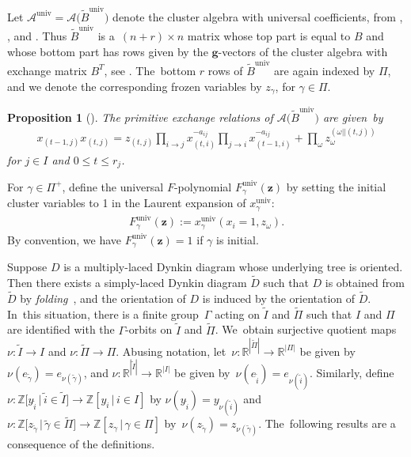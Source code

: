\documentclass[pdftex]{sigma}%
\def\R{{\mathbb R}}
\def\Z{{\mathbb Z}}
\def\A{{\mathcal{A}}}
\def\univ{{\operatorname{univ}}}
\def\tB{{\tilde B}}
\def\tD{{\tilde D}}
\def\tB{{\tilde B}}
\def\tI{{\tilde I}}
\def\z{{\mathbf z}}
\def\g{{\mathbf g}}
\def\tgamma{{\tilde \gamma}}
\def\tPi{{\tilde \Pi}}
\numberwithin{equation}{section}
\newtheorem{Proposition}[Theorem]{Proposition}
\begin{document}
\bigskip{}
Let $\A^{\univ} = \A\big(\tB^\univ\big)$ denote the cluster algebra with universal coefficients, from \cite[Theorem~12.4]{CA4}, \cite[Section~5]{YZ}, and \cite[Theorem~10.12 and Remark 10.13]{Reading}. Thus $\tB^{\univ}$ is a~$(n+r) \times n$ matrix whose top part is equal to $B$ and whose bottom part has rows given by the $\g$-vectors of the cluster algebra with exchange matrix $B^T$, see \cite{Reading}. The~bottom $r$ rows of $\tB^\univ$ are again indexed by $\Pi$, and we denote the corresponding frozen variables by $z_\gamma$, for $\gamma \in \Pi$.

\begin{Proposition}[{\cite[Proposition~5.6]{YZ}}] \label{prop:YZ}
The primitive exchange relations of $\A\big(\tB^\univ\big)$ are given~by
\begin{gather}\label{eq:exchange}
x_{(t-1,j)} x_{(t,j)} = z_{(t,j)} \prod_{i \to j} x_{(t,i)}^{-a_{ij}} \prod_{j \to i} x_{(t-1,i)}^{-a_{ij}} + \prod_\omega z_\omega^{(\omega|| (t,j))}
\end{gather}
for $j \in I$ and $0 \leq t \leq r_j$.
\end{Proposition}

\bigskip{}
For $\gamma \in \Pi^+$, define the universal $F$-polynomial $F^\univ_\gamma(\z)$ by setting the initial cluster variables to 1 in the Laurent expansion of $x^\univ_\gamma$:
\begin{gather*}
F^\univ_\gamma(\z) := x^\univ_\gamma(x_i = 1, z_\omega).
\end{gather*}
By convention, we have $F^\univ_\gamma(\z) = 1$ if $\gamma$ is initial.

\bigskip{} %
Suppose $D$ is a multiply-laced Dynkin diagram whose underlying tree is oriented. Then there exists a simply-laced Dynkin diagram $\tD$ such that $D$ is obtained from $\tD$ by \emph{folding}~\cite{Dup}, and the orientation of $D$ is induced by the orientation of $\tD$. In~this situation, there is a finite group~$\Gamma$ acting on $\tilde I$ and $\tPi$ such that $I$ and $\Pi$ are identified with the $\Gamma$-orbits on $\tilde I$ and $\tPi$. We~obtain surjective quotient maps $\nu\colon \tI \to I$ and $\nu\colon \tPi \to \Pi$.
Abusing notation, let~$\nu\colon \R^{|\tPi|} \to \R^{|\Pi|}$ be given by $\nu(e_{\tgamma}) = e_{\nu(\tgamma)}$, and $\nu\colon \R^{|\tilde I|} \to \R^{|I|}$ be given by~$\nu(e_{\tilde i}) = e_{\nu(\tilde i)}$. Similarly, define $\nu\colon \Z\big[y_{\tilde i} \,|\, \tilde i \in \tilde I\big] \to \Z[y_i \,|\, i \in I]$ by $\nu(y_{\tilde i}) = y_{\nu(\tilde i)}$ and $\nu\colon \Z\big[z_{\tgamma} \,|\, \tgamma \in \tPi\big] \to \Z[z_\gamma \,|\, \gamma \in \Pi]$ by~$\nu(z_{\tgamma})= z_{\nu(\tgamma)}$. The~following results are a consequence of the definitions.
\end{document}
